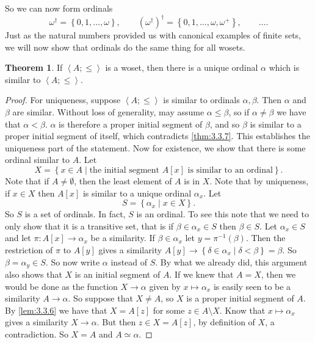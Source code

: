 \documentclass{article}
\newcommand{\rb}[1]{\left( #1 \right)}
\renewcommand{\sb}[1]{\left[ #1 \right]}
\newcommand{\cb}[1]{\left\{ #1 \right\}}
\newcommand{\ab}[1]{\left\langle #1 \right\rangle}
\theoremstyle{definition}\newtheorem{definition}{Definition}[subsection]
\theoremstyle{definition}\newtheorem{remark}[definition]{Remark}
\theoremstyle{definition}\newtheorem*{example}{Example}
\theoremstyle{definition}\newtheorem*{note}{Note}
\newtheorem{theorem}[definition]{Theorem}
\begin{document}
So we can now form ordinals
$$ \omega^\dagger = \cb{0, 1, \dots, \omega}, \qquad \rb{\omega^\dagger}^\dagger = \cb{0, 1, \dots, \omega, \omega^+}, \qquad \dots. $$
Just as the natural numbers provided us with canonical examples of finite sets, we will now show that ordinals do the same thing for all wosets.

\begin{theorem}
\label{thm:3.4.8}
If $ \ab{A; \le} $ is a woset, then there is a unique ordinal $ \alpha $ which is similar to $ \ab{A; \le} $.
\end{theorem}

\begin{proof}
For uniqueness, suppose $ \ab{A; \le} $ is similar to ordinals $ \alpha, \beta $. Then $ \alpha $ and $ \beta $ are similar. Without loss of generality, may assume $ \alpha \le \beta $, so if $ \alpha \ne \beta $ we have that $ \alpha < \beta $. $ \alpha $ is therefore a proper initial segment of $ \beta $, and so $ \beta $ is similar to a proper initial segment of itself, which contradicts \ref{thm:3.3.7}. This establishes the uniqueness part of the statement. Now for existence, we show that there is some ordinal similar to $ A $. Let
$$ X = \cb{x \in A \mid \text{the initial segment } A\sb{x} \text{ is similar to an ordinal}}. $$
Note that if $ A \ne \emptyset $, then the least element of $ A $ is in $ X $. Note that by uniqueness, if $ x \in X $ then $ A\sb{x} $ is similar to a unique ordinal $ \alpha_x $. Let
$$ S = \cb{\alpha_x \mid x \in X}. $$
So $ S $ is a set of ordinals. In fact, $ S $ is an ordinal. To see this note that we need to only show that it is a transitive set, that is if $ \beta \in \alpha_x \in S $ then $ \beta \in S $. Let $ \alpha_x \in S $ and let $ \pi : A\sb{x} \to \alpha_x $ be a similarity. If $ \beta \in \alpha_x $ let $ y = \pi^{-1}\rb{\beta} $. Then the restriction of $ \pi $ to $ A\sb{y} $ gives a similarity $ A\sb{y} \to \cb{\delta \in \alpha_x \mid \delta < \beta} = \beta $. So $ \beta = \alpha_y \in S $. So now write $ \alpha $ instead of $ S $. By what we already did, this argument also shows that $ X $ is an initial segment of $ A $. If we knew that $ A = X $, then we would be done as the function $ X \to \alpha $ given by $ x \mapsto \alpha_x $ is easily seen to be a similarity $ A \to \alpha $. So suppose that $ X \ne A $, so $ X $ is a proper initial segment of $ A $. By \ref{lem:3.3.6} we have that $ X = A\sb{z} $ for some $ z \in A \setminus X $. Know that $ x \mapsto \alpha_x $ gives a similarity $ X \to \alpha $. But then $ z \in X = A\sb{z} $, by definition of $ X $, a contradiction. So $ X = A $ and $ A \simeq \alpha $.
\end{proof}
\end{document}
